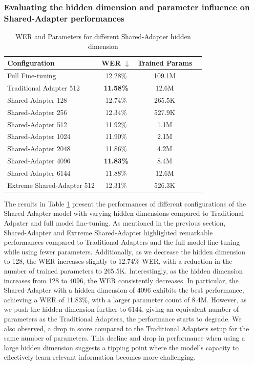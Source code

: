 \subsubsection{Evaluating the hidden dimension and parameter influence on Shared-Adapter performances}
\begin{table}[ht]
    \centering
    \begin{tabular}{l c c c}
        \hline
        \textbf{Configuration} & \textbf{WER $\downarrow$} & \textbf{Trained Params} \\
        \hline
        Full Fine-tuning & 12.28\% & 109.1M \\ \hline
        Traditional Adapter 512 & \textbf{11.58\%} & 12.6M \\ \hline
        Shared-Adapter 128 & 12.74\% & 265.5K \\
        Shared-Adapter 256 & 12.34\% & 527.9K \\
        Shared-Adapter 512 & 11.92\% & 1.1M \\
        Shared-Adapter 1024 & 11.90\% & 2.1M \\
        Shared-Adapter 2048 & 11.86\% & 4.2M \\
        Shared-Adapter 4096 & \textbf{11.83\%} & 8.4M \\
        Shared-Adapter 6144 & 11.88\% & 12.6M \\ \hline
        Extreme Shared-Adapter  512& 12.31\% & 526.3K \\ \hline
    \end{tabular}
    \caption{WER and Parameters for different Shared-Adapter hidden dimension}
    \label{tab:shared_adapter_results}
\end{table}


The results in Table \ref{tab:shared_adapter_results} present the performances of different configurations of the Shared-Adapter model with varying hidden dimensions compared to Traditional Adpater and full model fine-tuning. As mentioned in the previous section, Shared-Adapter and Extreme Shared-Adapter highlighted remarkable performances compared to Traditional Adapters and the full model fine-tuning while using fewer parameters. Additionally, as we decrease the hidden dimension to 128, the WER increases slightly to 12.74\% \ac{WER}, with a reduction in the number of trained parameters to 265.5K. Interestingly, as the hidden dimension increases from 128 to 4096, the \ac{WER} consistently decreases. In particular, the Shared-Adapter with a hidden dimension of 4096 exhibits the best performance, achieving a \ac{WER} of 11.83\%, with a larger parameter count of 8.4M. 
However, as we push the hidden dimension further to 6144, giving an equivalent number of parameters as the Traditional Adapters, the performance starts to degrade. We also observed, a drop in score compared to the Traditional Adapters setup for the same number of parameters. This decline and drop in performance when using a large hidden dimension suggests a tipping point where the model's capacity to effectively learn relevant information becomes more challenging.

